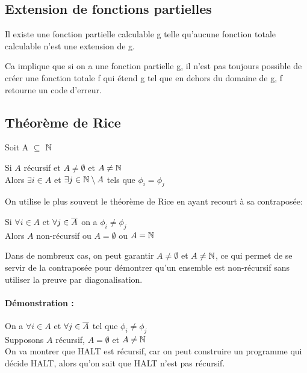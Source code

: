 
\subsection{Extension de fonctions partielles}
\label{sub:extension_de_fonctions_partielles}

\begin{mytheo}
	Il existe une fonction partielle calculable g telle 
	qu'aucune fonction totale calculable n'est une extension de g.
\end{mytheo}

\begin{myrem}
	Ca implique que si on a une fonction partielle g, il n'est pas 
	toujours possible de créer une fonction totale f qui étend g
	tel que en dehors du domaine de g, f retourne un code d'erreur.
\end{myrem}
	

\subsection{Théorème de Rice}
\label{sub:th_or_me_de_rice}

Soit A $\subseteq$ $\mathbb{N}$

\begin{mytheo}[Rice]
	Si $A$ récursif et $A\neq \emptyset$ et $A \neq \mathbb{N}$ \\
	Alors $\exists i \in A$ et $\exists j \in \mathbb{N} \setminus A$ tels que $\phi _i = \phi _j$
\end{mytheo}

On utilise le plus souvent le théorème de Rice en ayant recourt à sa contraposée:

\begin{mytheo}
	Si $\forall  i \in A$ et $\forall j \in \overline{A}$ on a $\phi_i \neq \phi_j$ \\
	Alors $A$ non-récursif ou $A = \emptyset$ ou $A = \mathbb{N}$
\end{mytheo}

Dans de nombreux cas, on peut garantir $A \neq \emptyset$ et $A \neq \mathbb{N}$, ce qui permet de se servir de la contraposée pour démontrer qu'un ensemble est non-récursif sans utiliser la preuve par diagonalisation.

\paragraph{Démonstration : }
On a $\forall i \in A$ et $\forall j \in \overline{A}$ tel que $\phi_i \neq
\phi_j$\\
Supposons $A$ récursif, $A=\emptyset$ et $A\neq \mathbb{N}$\\
On va montrer que HALT est récursif, car on peut construire un programme qui 
décide HALT, alors qu'on sait que HALT n'est pas récursif.

